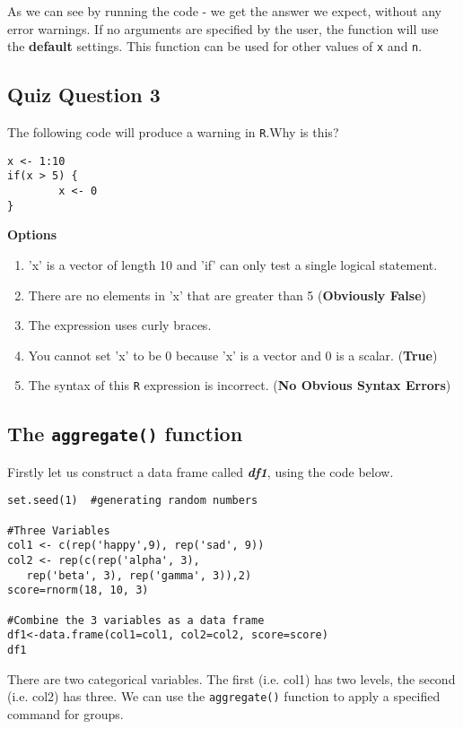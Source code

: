 \documentclass[12pt]{article}
\begin{document}
As we can see by running the code - we get the answer we expect, without any error warnings. If no arguments are specified by the user, the function will use the \textbf{default} settings. This function can be used for other values of \texttt{x} and \texttt{n}.

\newpage
\subsection*{Quiz Question 3}
The following code will produce a warning in \texttt{R}.Why is this?
\begin{framed}
\begin{verbatim}
x <- 1:10
if(x > 5) {
        x <- 0
}
\end{verbatim}
\end{framed}

\textbf{Options}
\begin{enumerate}
\item 'x' is a vector of length 10 and 'if' can only test a single logical statement.
\item There are no elements in 'x' that are greater than 5 (\textbf{Obviously False})
\item The expression uses curly braces.
\item You cannot set 'x' to be 0 because 'x' is a vector and 0 is a scalar. (\textbf{True})
\item The syntax of this \texttt{R} expression is incorrect. (\textbf{No Obvious Syntax Errors})
\end{enumerate}

\newpage
\subsection*{The \texttt{aggregate()} function}
Firstly let us construct a data frame called \textit{\textbf{df1}}, using the code below.
\begin{framed}
\begin{verbatim}
set.seed(1)  #generating random numbers

#Three Variables
col1 <- c(rep('happy',9), rep('sad', 9)) 
col2 <- rep(c(rep('alpha', 3), 
   rep('beta', 3), rep('gamma', 3)),2) 
score=rnorm(18, 10, 3) 
 
#Combine the 3 variables as a data frame
df1<-data.frame(col1=col1, col2=col2, score=score) 
df1
\end{verbatim}
\end{framed}
\noindent There are two categorical variables. The first (i.e. col1) has two levels, the second (i.e. col2) has three. We can use the \texttt{aggregate()} function to apply a specified command for groups.
\end{document}
